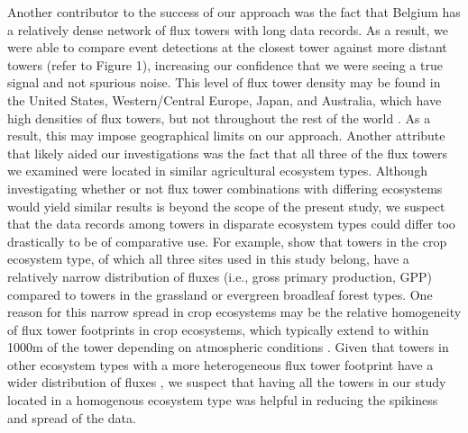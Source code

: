 \documentclass{article}
\begin{document}
Another contributor to the success of our approach was the fact that Belgium has a relatively dense network of flux towers with long data records. As a result, we were able to compare event detections at the closest tower against more distant towers (refer to Figure 1), increasing our confidence that we were seeing a true signal and not spurious noise. This level of flux tower density may be found in the United States, Western/Central Europe, Japan, and Australia, which have high densities of flux towers, but not throughout the rest of the world \citep{baldocchi2001fluxnet,pastorello2020fluxnet2015}. As a result, this may impose geographical limits on our approach. Another attribute that likely aided our investigations was the fact that all three of the flux towers we examined were located in similar agricultural ecosystem types. Although investigating whether or not flux tower combinations with differing ecosystems would yield similar results is beyond the scope of the present study, we suspect that the data records among towers in disparate ecosystem types could differ too drastically to be of comparative use. For example, \citet{pastorello2020fluxnet2015} show that towers in the crop ecosystem type, of which all three sites used in this study belong, have a relatively narrow distribution of fluxes (i.e., gross primary production, GPP) compared to towers in the grassland or evergreen broadleaf forest types. One reason for this narrow spread in crop ecosystems may be the relative homogeneity of flux tower footprints in crop ecosystems, which typically extend to within 1000m of the tower depending on atmospheric conditions \citep[e.g., wind speed and direction,][]{chuRepresentativenessEddyCovarianceFlux2021}. Given that towers in other ecosystem types with a more heterogeneous flux tower footprint have a wider distribution of fluxes \citep[e.g.][]{pastorello2020fluxnet2015}, we suspect that having all the towers in our study located in a homogenous ecosystem type was helpful in reducing the spikiness and spread of the data. 
\end{document}
